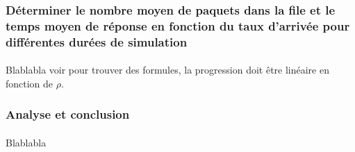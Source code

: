             \subsubsection{Déterminer le nombre moyen de paquets dans la file et le temps moyen de réponse en fonction du taux d'arrivée pour différentes durées de simulation}
%
                \paragraph{}
Blablabla
voir pour trouver des formules, la progression doit être linéaire en fonction de $\rho$.
%
            \subsubsection{Analyse et conclusion}
%
                \paragraph{}
Blablabla
%
    \clearpage
%
